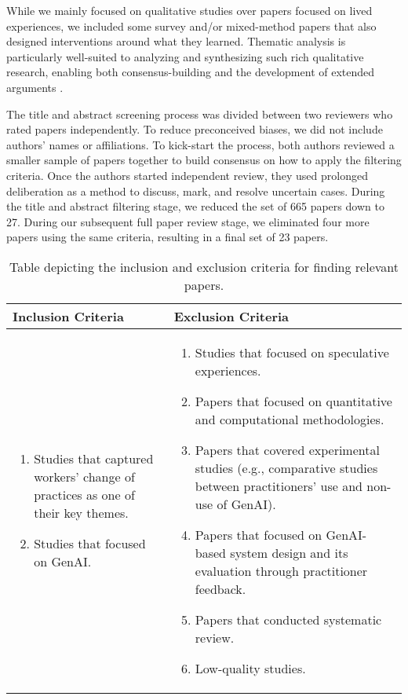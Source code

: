 While we mainly focused on qualitative studies over papers focused on lived experiences, we included some survey and/or mixed-method papers that also designed interventions around what they learned.
Thematic analysis is particularly well-suited to analyzing and synthesizing such rich qualitative research, enabling both consensus-building and the development of extended arguments \cite{Barnett2009}. 
  
The title and abstract screening process was divided between two reviewers who rated papers independently. To reduce preconceived biases, we did not include authors' names or affiliations. To kick-start the process, both authors reviewed a smaller sample of papers together to build consensus on how to apply the filtering criteria. Once the authors started independent review, they used prolonged deliberation \cite{creswell} as a method to discuss, mark, and resolve uncertain cases. During the title and abstract filtering stage, we reduced the set of 665 papers down to 27. During our subsequent full paper review stage, we eliminated four more papers using the same criteria, resulting in a final set of 23 papers.


\begin{table}
    \centering
    \begin{tabular}{p{5cm} p{7cm}}
        \hline
        Inclusion Criteria   & Exclusion Criteria \\
        \hline
        \begin{enumerate}
            \item Studies that captured workers' change of practices as one of their key themes.
            \item Studies that focused on GenAI.
         
            
        \end{enumerate} &
        \begin{enumerate}
            \item Studies that focused on speculative experiences.
            \item Papers that focused on quantitative and computational methodologies. 
            \item Papers that covered experimental studies (e.g., comparative studies between practitioners' use and non-use of GenAI).
            \item Papers that focused on GenAI-based system design and its evaluation through practitioner feedback.
            \item Papers that conducted systematic review.
            \item Low-quality studies.    
            \
        \end{enumerate}
        \\
        \hline
    \end{tabular}
    \caption{Table depicting the inclusion and exclusion criteria for finding relevant papers.}
    \label{tab:exclusion_inclusion}
\end{table}

